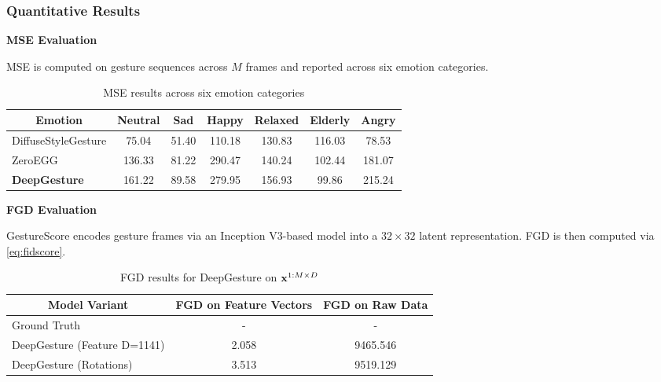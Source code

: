 \subsubsection{Quantitative Results}

\textbf{MSE Evaluation}
\label{subsec:MSEResult}

MSE is computed on gesture sequences across $M$ frames and reported across six emotion categories.

\begin{table}[h]
	\centering
		\begin{tabular}{lcccccc}
			\hline
			\multicolumn{1}{c}{Emotion} & Neutral & Sad & Happy & Relaxed & Elderly & Angry \\ \hline
			DiffuseStyleGesture  & 75.04 & 51.40 & 110.18 & 130.83     & 116.03    & 78.53     \\
			ZeroEGG              & 136.33 & 81.22 & 290.47 & 140.24     & 102.44    & 181.07     \\
			\textbf{DeepGesture}   & 161.22 & 89.58 & 279.95 & 156.93     & 99.86     & 215.24     \\
			\hline
		\end{tabular}%
	\caption{MSE results across six emotion categories}
	\label{table:EvaluationMSE}
\end{table}

\textbf{FGD Evaluation}

GestureScore encodes gesture frames via an Inception V3-based model into a $32 \times 32$ latent representation. FGD is then computed via \autoref{eq:fidscore}.

\begin{table}[h]
	\centering
		\begin{tabular}{lcc}
			\hline
			\multicolumn{1}{c}{Model Variant} & FGD on Feature Vectors & FGD on Raw Data \\ \hline
			Ground Truth             & -             & -            \\
			DeepGesture (Feature D=1141) & 2.058  & 9465.546     \\
			DeepGesture (Rotations)      & 3.513  & 9519.129     \\
			\hline
		\end{tabular}
	\caption{FGD results for DeepGesture on $\mathbf{x}^{1:M \times D}$}
	\label{table:EvalFGD}
\end{table}

